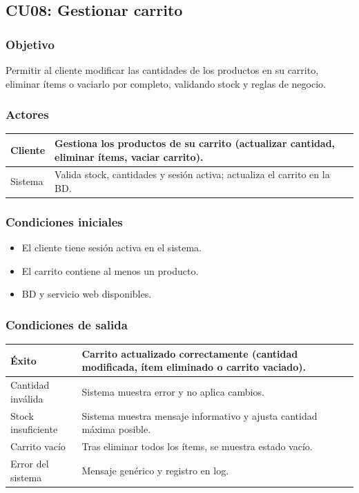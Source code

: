 \documentclass[12pt,a4paper]{article}
\begin{document}
\subsection{CU08: Gestionar carrito}
\subsubsection*{Objetivo}
Permitir al cliente modificar las cantidades de los productos en su carrito, eliminar ítems o vaciarlo por completo, validando stock y reglas de negocio.

\subsubsection*{Actores}
\begin{longtable}{|l|p{10cm}|}
    \hline
    Cliente & Gestiona los productos de su carrito (actualizar cantidad, eliminar ítems, vaciar carrito). \\ \hline
    Sistema & Valida stock, cantidades y sesión activa; actualiza el carrito en la BD.                    \\ \hline
\end{longtable}

\subsubsection*{Condiciones iniciales}
\begin{itemize}[label=--]
    \item El cliente tiene sesión activa en el sistema.
    \item El carrito contiene al menos un producto.
    \item BD y servicio web disponibles.
\end{itemize}

\subsubsection*{Condiciones de salida}
\begin{longtable}{|l|p{10cm}|}
    \hline
    Éxito              & Carrito actualizado correctamente (cantidad modificada, ítem eliminado o carrito vaciado). \\ \hline
    Cantidad inválida  & Sistema muestra error y no aplica cambios.                                                 \\ \hline
    Stock insuficiente & Sistema muestra mensaje informativo y ajusta cantidad máxima posible.                      \\ \hline
    Carrito vacío      & Tras eliminar todos los ítems, se muestra estado vacío.                                    \\ \hline
    Error del sistema  & Mensaje genérico y registro en log.                                                        \\ \hline
\end{longtable}
\end{document}
